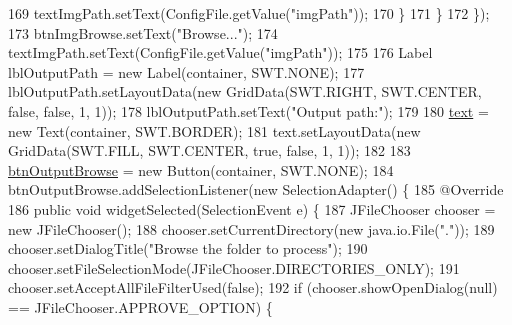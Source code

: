 \begin{DoxyCode}
169                     textImgPath.setText(ConfigFile.getValue(\textcolor{stringliteral}{"imgPath"}));
170                 \}
171             \}
172         \});
173         btnImgBrowse.setText(\textcolor{stringliteral}{"Browse..."});
174         textImgPath.setText(ConfigFile.getValue(\textcolor{stringliteral}{"imgPath"}));
175         
176         Label lblOutputPath = \textcolor{keyword}{new} Label(container, SWT.NONE);
177         lblOutputPath.setLayoutData(\textcolor{keyword}{new} GridData(SWT.RIGHT, SWT.CENTER, \textcolor{keyword}{false}, \textcolor{keyword}{false}, 1, 1));
178         lblOutputPath.setText(\textcolor{stringliteral}{"Output path:"});
179         
180         \hyperlink{classit_1_1isislab_1_1masonhelperdocumentation_1_1mason_1_1wizards_1_1_b___project_information_page_ac62e1a690396a9296b72dda3e66d0a55}{text} = \textcolor{keyword}{new} Text(container, SWT.BORDER);
181         text.setLayoutData(\textcolor{keyword}{new} GridData(SWT.FILL, SWT.CENTER, \textcolor{keyword}{true}, \textcolor{keyword}{false}, 1, 1));
182         
183         \hyperlink{classit_1_1isislab_1_1masonhelperdocumentation_1_1mason_1_1wizards_1_1_b___project_information_page_ab2605aae4ffe03c9e27ad871c1eab17f}{btnOutputBrowse} = \textcolor{keyword}{new} Button(container, SWT.NONE);
184         btnOutputBrowse.addSelectionListener(\textcolor{keyword}{new} SelectionAdapter() \{
185             @Override
186             \textcolor{keyword}{public} \textcolor{keywordtype}{void} widgetSelected(SelectionEvent e) \{
187                 JFileChooser chooser = \textcolor{keyword}{new} JFileChooser();
188                 chooser.setCurrentDirectory(\textcolor{keyword}{new} java.io.File(\textcolor{stringliteral}{"."}));
189                 chooser.setDialogTitle(\textcolor{stringliteral}{"Browse the folder to process"});
190                 chooser.setFileSelectionMode(JFileChooser.DIRECTORIES\_ONLY);
191                 chooser.setAcceptAllFileFilterUsed(\textcolor{keyword}{false});
192                 \textcolor{keywordflow}{if} (chooser.showOpenDialog(null) == JFileChooser.APPROVE\_OPTION) \{                         
           

\end{DoxyCode}
